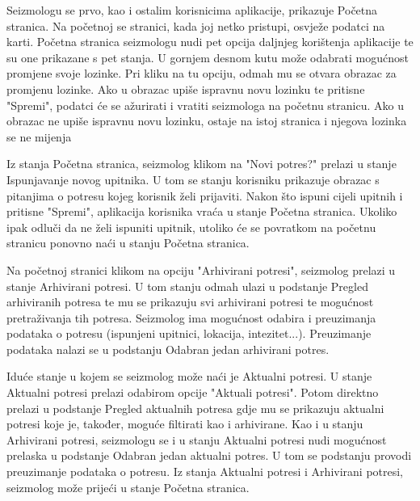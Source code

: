 		Seizmologu se prvo, kao i ostalim korisnicima aplikacije, prikazuje Početna stranica. Na početnoj se stranici, kada joj netko pristupi, osvježe podatci na karti. Početna stranica seizmologu nudi pet opcija daljnjeg korištenja aplikacije te su one prikazane s pet stanja. 
        U gornjem desnom kutu može odabrati mogućnost promjene svoje lozinke. Pri kliku na tu opciju, odmah mu se otvara obrazac za promjenu lozinke.
        Ako u obrazac upiše ispravnu novu lozinku te pritisne "Spremi", podatci će se ažurirati i vratiti seizmologa na početnu stranicu. Ako u obrazac ne upiše ispravnu novu lozinku, ostaje na istoj stranica i njegova lozinka se ne mijenja
        
		Iz stanja Početna stranica, seizmolog klikom na "Novi potres?" prelazi u stanje Ispunjavanje novog upitnika. U tom se stanju korisniku prikazuje obrazac s pitanjima o potresu kojeg korisnik želi prijaviti. 
        Nakon što ispuni cijeli upitnih i pritisne "Spremi", aplikacija korisnika vraća u stanje Početna stranica.
        Ukoliko ipak odluči da ne želi ispuniti upitnik, utoliko će se povratkom na početnu stranicu ponovno naći u stanju Početna stranica. 
        
		Na početnoj stranici klikom na opciju "Arhivirani potresi", seizmolog prelazi u stanje Arhivirani potresi. U tom stanju odmah ulazi u podstanje Pregled arhiviranih potresa te mu se prikazuju svi arhivirani potresi te mogućnost pretraživanja tih potresa.
        Seizmolog ima mogućnost odabira i preuzimanja podataka o potresu (ispunjeni upitnici, lokacija, intezitet...). Preuzimanje podataka nalazi se u podstanju Odabran jedan arhivirani potres.
        
		Iduće stanje u kojem se seizmolog može naći je Aktualni potresi. U stanje Aktualni potresi prelazi odabirom opcije "Aktuali potresi". 
        Potom direktno prelazi u podstanje Pregled aktualnih potresa gdje mu se prikazuju aktualni potresi koje je, također, moguće filtirati kao i arhivirane. Kao i u stanju Arhivirani potresi, seizmologu se i u stanju Aktualni potresi nudi mogućnost 
        prelaska u podstanje Odabran jedan aktualni potres. U tom se podstanju provodi preuzimanje podataka o potresu. Iz stanja Aktualni potresi i Arhivirani potresi, seizmolog može prijeći u stanje Početna stranica.
       
